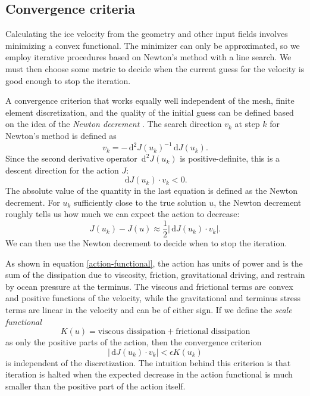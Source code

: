 \documentclass{article}
\theoremstyle{definition}
\theoremstyle{plain}
\newcommand{\ud}{\hspace{2pt}\mathrm{d}}
\begin{document}
\subsection{Convergence criteria}

Calculating the ice velocity from the geometry and other input fields involves minimizing a convex functional.
The minimizer can only be approximated, so we employ iterative procedures based on Newton's method with a line search.
We must then choose some metric to decide when the current guess for the velocity is good enough to stop the iteration.

A convergence criterion that works equally well independent of the mesh, finite element discretization, and the quality of the initial guess can be defined based on the idea of the \emph{Newton decrement} \citep{nocedal2006numerical}.
The search direction $v_k$ at step $k$ for Newton's method is defined as
\begin{equation}
    v_k = -\ud^2J(u_k)^{-1}\ud J(u_k).
\end{equation}
Since the second derivative operator $\ud^2J(u_k)$ is positive-definite, this is a descent direction for the action $J$:
\begin{equation}
    \ud J(u_k)\cdot v_k < 0.
\end{equation}
The absolute value of the quantity in the last equation is defined as the Newton decrement.
For $u_k$ sufficiently close to the true solution $u$, the Newton decrement roughly tells us how much we can expect the action to decrease:
\begin{equation}
    J(u_k) - J(u) \approx \frac{1}{2}|\ud J(u_k)\cdot v_k|.
\end{equation}
We can then use the Newton decrement to decide when to stop the iteration.

As shown in equation \eqref{action-functional}, the action has units of power and is the sum of the dissipation due to viscosity, friction, gravitational driving, and restrain by ocean pressure at the terminus.
The viscous and frictional terms are convex and positive functions of the velocity, while the gravitational and terminus stress terms are linear in the velocity and can be of either sign.
If we define the \emph{scale functional}
\begin{equation}
    K(u) = \text{viscous dissipation} + \text{frictional dissipation}
\end{equation}
as only the positive parts of the action, then the convergence criterion
\begin{equation}
    |\ud J(u_k)\cdot v_k| < \epsilon K(u_k)
\end{equation}
is independent of the discretization.
The intuition behind this criterion is that iteration is halted when the expected decrease in the action functional is much smaller than the positive part of the action itself.
\end{document}
